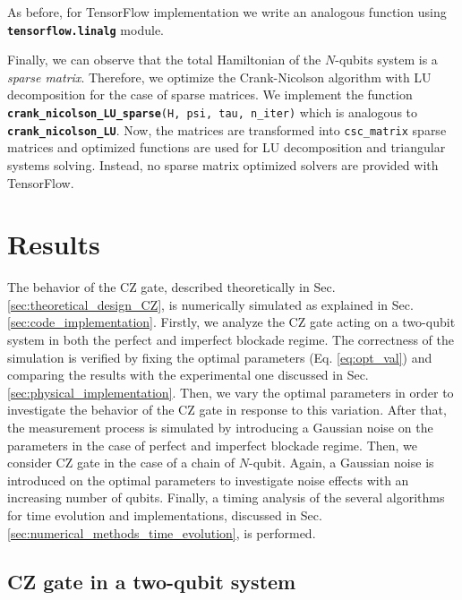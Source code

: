 \documentclass[rmp,10pt,onecolumn,fleqn,notitlepage]{revtex4-1}
\begin{document}
As before, for TensorFlow implementation we write an analogous function using {\bfseries\texttt{tensorflow.linalg}} module.

Finally, we can observe that the total Hamiltonian of the $N$-qubits system is a \textit{sparse matrix}. Therefore, we optimize the Crank-Nicolson algorithm with LU decomposition for the case of sparse matrices. We implement the function {\bfseries\texttt{crank\_nicolson\_LU\_sparse}}\texttt{(H, psi, tau, n\_iter)} which is analogous to  {\bfseries\texttt{crank\_nicolson\_LU}}. Now, the matrices are transformed into \texttt{csc\_matrix} sparse matrices and optimized functions are used for LU decomposition and triangular systems solving. Instead, no sparse matrix optimized solvers are provided with TensorFlow. 








\clearpage

\section{Results}


The behavior of the CZ gate, described theoretically in Sec. \ref{sec:theoretical_design_CZ}, is numerically simulated as explained in Sec. \ref{sec:code_implementation}. Firstly, we analyze the CZ gate acting on a two-qubit system in both the perfect and imperfect blockade regime. The correctness of the simulation is verified by fixing the optimal parameters (Eq. \eqref{eq:opt_val}) and comparing the results with the experimental one discussed in Sec. \ref{sec:physical_implementation}. Then, we vary the optimal parameters in order to investigate the behavior of the CZ gate in response to this variation. After that, the measurement process is simulated by introducing a Gaussian noise on the parameters in the case of perfect and imperfect blockade regime.
Then, we consider CZ gate in the case of a chain of $N$-qubit. Again, a Gaussian noise is introduced on the optimal parameters to investigate noise effects with an increasing number of qubits.
Finally, a timing analysis of the several algorithms for time evolution and implementations, discussed in Sec. \ref{sec:numerical_methods_time_evolution}, is performed. 

\subsection{CZ gate in a two-qubit system}
\end{document}
